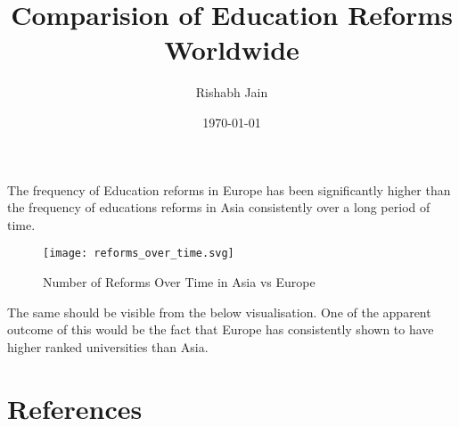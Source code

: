 \documentclass{article}
\begin{document}
\title{Comparision of Education Reforms Worldwide }
\author{Rishabh Jain}
\date{\today}
\maketitle


\begin{singlecolumn}{0}
 The frequency of Education reforms in Europe has been significantly higher than the frequency of educations reforms in Asia consistently over a long period of time. 
\begin{figure}[h]
\centering
\texttt{[image: reforms\_over\_time.svg]}
\caption{Number of Reforms Over Time in Asia vs Europe}
\label{fig:reforms}
\end{figure}
 The same should be visible from the below visualisation.
 One of the apparent outcome of this would be the fact that Europe has consistently shown to have higher ranked universities than Asia.
 
\end{singlecolumn}


\section*{References}
\lipsum[11]
\end{document}
